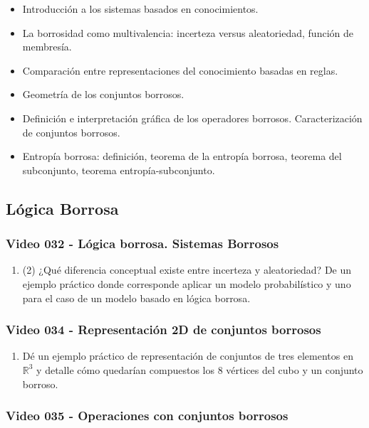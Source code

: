 \documentclass[a4paper,10pt,spanish,oneside]{article}
\begin{document}
\begin{itemize}
\item Introducción a los sistemas basados en conocimientos.
\item La borrosidad como multivalencia: incerteza versus aleatoriedad, función de membresía.
\item Comparación entre representaciones del conocimiento basadas en reglas.
\item Geometría de los conjuntos borrosos.
\item Definición e interpretación gráfica de los operadores borrosos. Caracterización de conjuntos borrosos.
\item Entropía borrosa: definición, teorema de la entropía borrosa, teorema del subconjunto, teorema entropía-subconjunto.
\end{itemize}

\subsection{Lógica Borrosa}

\subsubsection{Video 032 - Lógica borrosa. Sistemas Borrosos}

\begin{enumerate}
\item (2) ¿Qué diferencia conceptual existe entre incerteza y aleatoriedad? De un ejemplo práctico donde corresponde aplicar un modelo probabilístico y uno para el caso de un modelo basado en lógica borrosa.
\end{enumerate}

\subsubsection{Video 034 - Representación 2D de conjuntos borrosos}

\begin{enumerate}
\item Dé un ejemplo práctico de representación de conjuntos de tres elementos en $\mathbb{R}^{3}$ y detalle cómo quedarían compuestos los 8 vértices del cubo y un conjunto borroso.
\end{enumerate}

\subsubsection{Video 035 - Operaciones con conjuntos borrosos}
\end{document}
